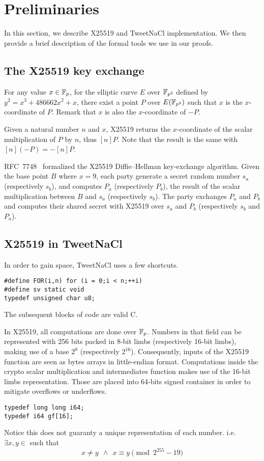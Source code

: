 \section{Preliminaries}
\label{preliminaries}

In this section, we describe X25519 and TweetNaCl implementation.
We then provide a brief description of the formal tools we use in our proofs.

\subsection{The X25519 key exchange}
\label{preliminaries:A}

For any value $x \in \mathbb{F}_{p}$, for the elliptic curve $E$ over $\mathbb{F}_{p^2}$
defined by $y^2 = x^3 + 486662 x^2 + x$, there exist a point $P$ over $E(\mathbb{F}_{p^2})$
such that $x$ is the $x$-coordinate of $P$. Remark that $x$ is also the $x$-coordinate of $-P$.

Given a natural number $n$ and $x$, X25519 returns the $x$-coordinate of the
scalar multiplication of $P$ by $n$, thus $[n]P$. Note that the result is the
same with $[n](-P) = -[n]P$.

RFC~7748~\cite{rfc7748} formalized the X25519 Diffie–Hellman key-exchange algorithm.
Given the base point $B$ where $x=9$, each party generate a secret random number
$s_a$ (respectively $s_b$), and computes $P_a$ (respectively $P_b$), the result
of the scalar multiplication between $B$ and $s_a$ (respectively $s_b$).
The party exchanges $P_a$ and $P_b$ and computes their shared secret with X25519
over $s_a$ and $P_b$ (respectively $s_b$ and $P_a$).

\subsection{X25519 in TweetNaCl}
\label{preliminaries:B}

In order to gain space, TweetNaCl uses a few shortcuts.
\begin{lstlisting}[language=Ctweetnacl]
#define FOR(i,n) for (i = 0;i < n;++i)
#define sv static void
typedef unsigned char u8;
\end{lstlisting}
The subsequent blocks of code are valid C.

In X25519, all computations are done over $\mathbb{F}_{p}$.
Numbers in that field can be represented with 256 bits packed in 8-bit limbs
(respectively 16-bit limbs), making use of a base $2^8$ (respectively $2^{16}$).
Consequently, inputs of the X25519 function are seen as bytes arrays in little-endian format.
Computations inside the crypto scalar multiplication and intermediates function
makes use of the 16-bit limbs representation.
Those are placed into 64-bits signed container in order to mitigate overflows or underflows.
\begin{lstlisting}[language=Ctweetnacl]
typedef long long i64;
typedef i64 gf[16];
\end{lstlisting}
Notice this does not guaranty a unique representation of each number. i.e.\\
$\exists x,y \in$  such that
\vspace{-0.25cm}
$$x \neq y\ \ \land\ \ x \equiv y \pmod{2^{255}-19}$$

